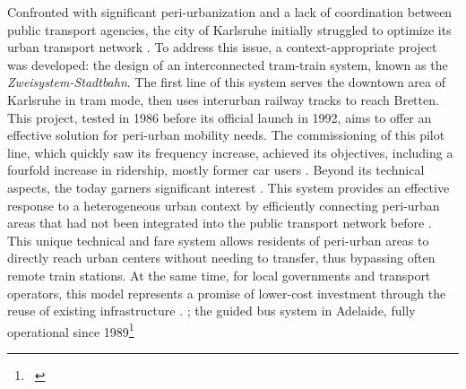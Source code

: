 \begin{refsegment}
{    Confronted with significant peri-urbanization and a lack of coordination between public transport agencies, the city of Karlsruhe initially struggled to optimize its urban transport network \textcolor{blue}{\autocite[p.~343-360 (Chapter~13)]{cervero_transit_1998}}. To address this issue, a context-appropriate project was developed: the design of an interconnected tram-train system, known as the \textsl{Zweisystem-Stadtbahn}. The first line of this system serves the downtown area of Karlsruhe in tram mode, then uses interurban railway tracks to reach Bretten. This project, tested in 1986 before its official launch in 1992, aims to offer an effective solution for peri-urban mobility needs. The commissioning of this pilot line, which quickly saw its frequency increase, achieved its objectives, including a fourfold increase in ridership, mostly former car users \textcolor{blue}{\autocite[41]{beaucire_reseau_2000}}. Beyond its technical aspects, the  today garners significant interest \textcolor{blue}{\autocite[41]{beaucire_reseau_2000}}. This system provides an effective response to a heterogeneous urban context by efficiently connecting peri-urban areas that had not been integrated into the public transport network before \textcolor{blue}{\autocite[57-65]{grisot_manifeste_2020}}. This unique technical and fare system allows residents of peri-urban areas to directly reach urban centers without needing to transfer, thus bypassing often remote train stations. At the same time, for local governments and transport operators, this model represents a promise of lower-cost investment through the reuse of existing infrastructure \textcolor{blue}{\autocite[17]{lhostis_multi-criteria_2017}}.
}; the guided bus system in Adelaide, fully operational since 1989\footnote{~
}
\end{refsegment}
